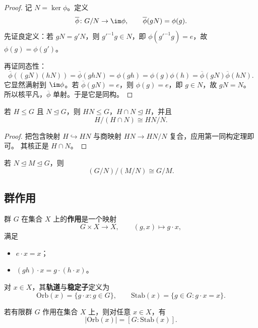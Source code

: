 \begin{proof}
记 $N=\ker\phi$。定义
\[
  \overline\phi\colon G/N\to \im\phi,
  \qquad
  \overline\phi(gN)=\phi(g).
\]
先证良定义：若 $gN=g'N$，则 $g'^{-1}g\in N$，即
$\phi(g'^{-1}g)=e$，故 $\phi(g)=\phi(g')$。

再证同态性：
\[
  \overline\phi((gN)(hN))=\overline\phi(ghN)=\phi(gh)=\phi(g)\phi(h)
  =\overline\phi(gN)\overline\phi(hN).
\]
它显然满射到 $\im\phi$。若 $\overline\phi(gN)=e$，则 $\phi(g)=e$，即 $g\in N$，故 $gN=N$。
所以核平凡，$\overline\phi$ 单射。于是它是同构。
\end{proof}

\begin{theorem}[第二同构定理]
若 $H\le G$ 且 $N\trianglelefteq G$，则 $HN\le G$，$H\cap N\trianglelefteq H$，并且
\begin{equation}
  H/(H\cap N)\cong HN/N.
\end{equation}
\end{theorem}

\begin{proof}
把包含映射 $H\hookrightarrow HN$ 与商映射 $HN\to HN/N$ 复合，应用第一同构定理即可。
其核正是 $H\cap N$。
\end{proof}

\begin{theorem}[第三同构定理]
若 $N\trianglelefteq M\trianglelefteq G$，则
\begin{equation}
  (G/N)/(M/N)\cong G/M.
\end{equation}
\end{theorem}

\subsection{群作用}

\begin{definition}
群 $G$ 在集合 $X$ 上的\textbf{作用}是一个映射
\[
  G\times X\to X,
  \qquad (g,x)\mapsto g\cdot x,
\]
满足
\begin{itemize}
  \item $e\cdot x=x$；
  \item $(gh)\cdot x=g\cdot(h\cdot x)$。
\end{itemize}
对 $x\in X$，其\textbf{轨道}与\textbf{稳定子}定义为
\[
  \mathrm{Orb}(x)=\{g\cdot x:g\in G\},
  \qquad
  \mathrm{Stab}(x)=\{g\in G:g\cdot x=x\}.
\]
\end{definition}

\begin{theorem}[轨道--稳定子定理]
若有限群 $G$ 作用在集合 $X$ 上，则对任意 $x\in X$，有
\begin{equation}
  |\mathrm{Orb}(x)|=[G:\mathrm{Stab}(x)].
\end{equation}
\end{theorem}

